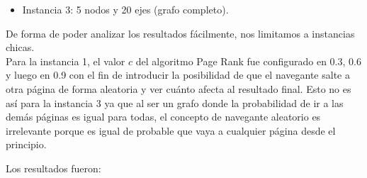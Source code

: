 \begin{itemize}
\begin{center}
        \end{center}
    \item Instancia 3: 5 nodos y 20 ejes (grafo completo).
        \begin{center}
        \end{center}
\end{itemize}
De forma de poder analizar los resultados fácilmente, nos limitamos a instancias chicas.\\

Para la instancia 1, el valor $c$ del algoritmo Page Rank fue configurado en 0.3, 0.6 y luego en 0.9 con el fin de introducir la posibilidad de que el navegante salte a otra página de forma aleatoria y ver cuánto afecta al resultado final. Esto no es así para la instancia 3 ya que al ser un grafo donde la probabilidad de ir a las demás páginas es igual para todas, el concepto de navegante aleatorio es irrelevante porque es igual de probable que vaya a cualquier página desde el principio.

Los resultados fueron:

